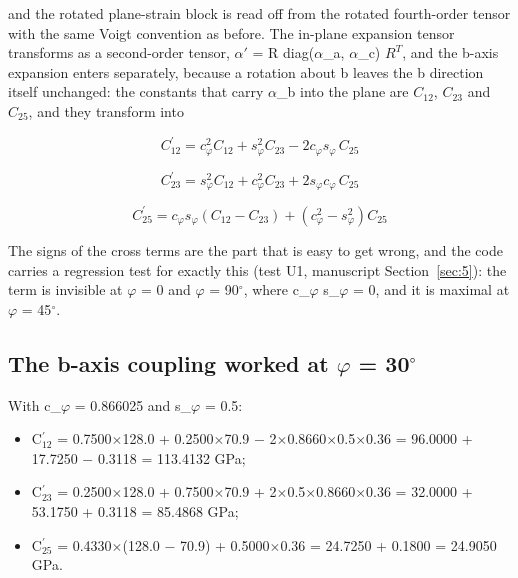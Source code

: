 \documentclass[preprint,12pt]{elsarticle}
\begin{document}
and the rotated plane-strain block is read off from the rotated fourth-order tensor with the same Voigt convention as before. The in-plane expansion tensor transforms as a second-order tensor, $\alpha '$ = R diag($\alpha$\_a, $\alpha$\_c) $R^{T}$, and the b-axis expansion enters separately, because a rotation about b leaves the b direction itself unchanged: the constants that carry $\alpha$\_b into the plane are $C_{12}$, $C_{23}$ and $C_{25}$, and they transform into

\begin{equation}
C^{\prime}_{12}=c_\varphi^2 C_{12}+s_\varphi^2 C_{23}-2c_\varphi s_\varphi\,C_{25} 
\label{eq:5}
\end{equation}

\begin{equation}
C^{\prime}_{23}=s_\varphi^2 C_{12}+c_\varphi^2 C_{23}+2s_\varphi c_\varphi\,C_{25} 
\label{eq:6}
\end{equation}

\begin{equation}
C^{\prime}_{25}=c_\varphi s_\varphi\left(C_{12}-C_{23}\right)+\left(c_\varphi^2-s_\varphi^2\right)C_{25} 
\label{eq:7}
\end{equation}

The signs of the cross terms are the part that is easy to get wrong, and the code carries a regression test for exactly this (test U1, manuscript Section~\ref{sec:5}): the term is invisible at $\varphi$ = 0 and $\varphi$ = 90$^{\circ}$, where c\_$\varphi$ s\_$\varphi$ = 0, and it is maximal at $\varphi$ = 45$^{\circ}$.

\subsection{The b-axis coupling worked at $\varphi$ = 30$^{\circ}$}
\label{sec:3.2}

With c\_$\varphi$ = 0.866025 and s\_$\varphi$ = 0.5:

\begin{itemize}
\item C$^{\prime}_{12}$ = 0.7500$\times$128.0 + 0.2500$\times$70.9 $-$ 2$\times$0.8660$\times$0.5$\times$0.36 = 96.0000 + 17.7250 $-$ 0.3118 = 113.4132 GPa;
\item C$^{\prime}_{23}$ = 0.2500$\times$128.0 + 0.7500$\times$70.9 + 2$\times$0.5$\times$0.8660$\times$0.36 = 32.0000 + 53.1750 + 0.3118 = 85.4868 GPa;
\item C$^{\prime}_{25}$ = 0.4330$\times$(128.0 $-$ 70.9) + 0.5000$\times$0.36 = 24.7250 + 0.1800 = 24.9050 GPa.
\end{itemize}
\end{document}
